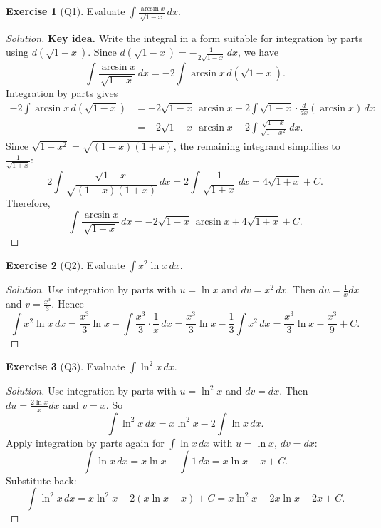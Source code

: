 \documentclass[11pt]{article}
\theoremstyle{definition}
\newtheorem{exercise}{Exercise}[section]
\newenvironment{solution}{\begin{proof}[Solution]}{\end{proof}}
\begin{document}
\begin{exercise}[Q1]
Evaluate $\displaystyle \int \frac{\arcsin x}{\sqrt{1-x}}\,dx$.
\end{exercise}

\begin{solution}
\textbf{Key idea.} Write the integral in a form suitable for integration by parts using $d(\sqrt{1-x})$.
Since $d(\sqrt{1-x})=-\frac{1}{2\sqrt{1-x}}\,dx$, we have
\[
\int \frac{\arcsin x}{\sqrt{1-x}}\,dx=-2\int \arcsin x\,d(\sqrt{1-x}).
\]
Integration by parts gives
\begin{align*}
-2\int \arcsin x\,d(\sqrt{1-x})
&=-2\sqrt{1-x}\,\arcsin x+2\int \sqrt{1-x}\cdot \frac{d}{dx}(\arcsin x)\,dx \\
&=-2\sqrt{1-x}\,\arcsin x+2\int \frac{\sqrt{1-x}}{\sqrt{1-x^2}}\,dx.
\end{align*}
Since $\sqrt{1-x^2}=\sqrt{(1-x)(1+x)}$, the remaining integrand simplifies to $\frac{1}{\sqrt{1+x}}$:
\[
2\int \frac{\sqrt{1-x}}{\sqrt{(1-x)(1+x)}}\,dx
=2\int \frac{1}{\sqrt{1+x}}\,dx
=4\sqrt{1+x}+C.
\]
Therefore,
\[
\int \frac{\arcsin x}{\sqrt{1-x}}\,dx=-2\sqrt{1-x}\,\arcsin x+4\sqrt{1+x}+C.
\]
\end{solution}

\begin{exercise}[Q2]
Evaluate $\displaystyle \int x^2\ln x\,dx$.
\end{exercise}

\begin{solution}
Use integration by parts with $u=\ln x$ and $dv=x^2\,dx$. Then $du=\frac{1}{x}dx$ and $v=\frac{x^3}{3}$.
Hence
\[
\int x^2\ln x\,dx=\frac{x^3}{3}\ln x-\int \frac{x^3}{3}\cdot \frac{1}{x}\,dx
=\frac{x^3}{3}\ln x-\frac{1}{3}\int x^2\,dx
=\frac{x^3}{3}\ln x-\frac{x^3}{9}+C.
\]
\end{solution}

\begin{exercise}[Q3]
Evaluate $\displaystyle \int \ln^2 x\,dx$.
\end{exercise}

\begin{solution}
Use integration by parts with $u=\ln^2 x$ and $dv=dx$. Then $du=\frac{2\ln x}{x}dx$ and $v=x$.
So
\[
\int \ln^2 x\,dx=x\ln^2 x-2\int \ln x\,dx.
\]
Apply integration by parts again for $\int \ln x\,dx$ with $u=\ln x$, $dv=dx$:
\[
\int \ln x\,dx=x\ln x-\int 1\,dx=x\ln x-x+C.
\]
Substitute back:
\[
\int \ln^2 x\,dx=x\ln^2 x-2(x\ln x-x)+C
=x\ln^2 x-2x\ln x+2x+C.
\]
\end{solution}
\end{document}
